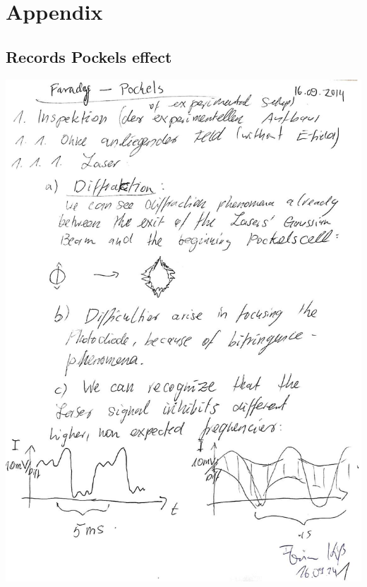 \clearpage
\section{Appendix}
\subsection{Records Pockels effect}
\includegraphics[width=0.9\linewidth]{record/pockels1}
\newpage
